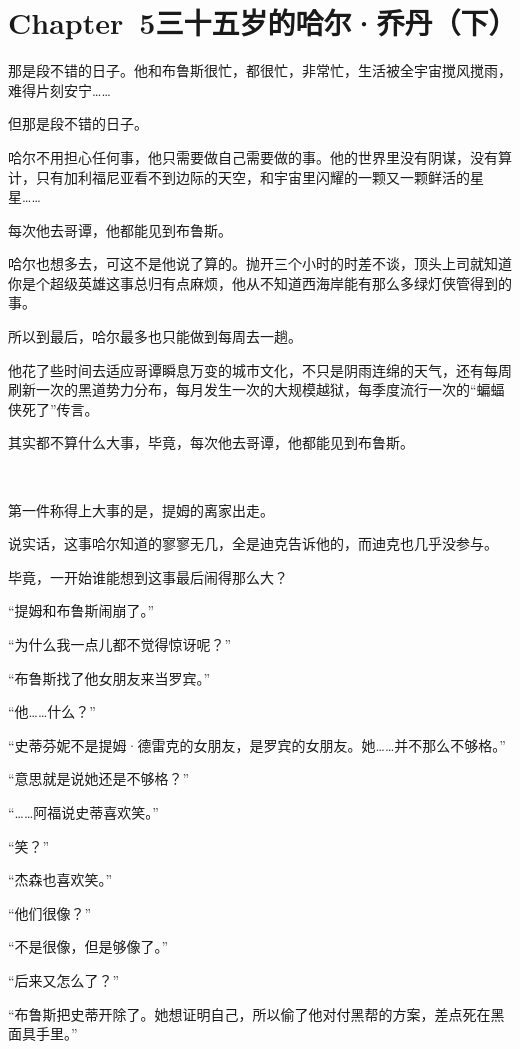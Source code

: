 \documentclass[../main]{subfiles}
\begin{document}

\section*{Chapter~5\hspace{1em}三十五岁的哈尔·乔丹（下）}

那是段不错的日子。他和布鲁斯很忙，都很忙，非常忙，生活被全宇宙搅风搅雨，难得片刻安宁……

但那是段不错的日子。

哈尔不用担心任何事，他只需要做自己需要做的事。他的世界里没有阴谋，没有算计，只有加利福尼亚看不到边际的天空，和宇宙里闪耀的一颗又一颗鲜活的星星……

每次他去哥谭，他都能见到布鲁斯。

哈尔也想多去，可这不是他说了算的。抛开三个小时的时差不谈，顶头上司就知道你是个超级英雄这事总归有点麻烦，他从不知道西海岸能有那么多绿灯侠管得到的事。

所以到最后，哈尔最多也只能做到每周去一趟。

他花了些时间去适应哥谭瞬息万变的城市文化，不只是阴雨连绵的天气，还有每周刷新一次的黑道势力分布，每月发生一次的大规模越狱，每季度流行一次的“蝙蝠侠死了”传言。

其实都不算什么大事，毕竟，每次他去哥谭，他都能见到布鲁斯。

~\

第一件称得上大事的是，提姆的离家出走。

说实话，这事哈尔知道的寥寥无几，全是迪克告诉他的，而迪克也几乎没参与。

毕竟，一开始谁能想到这事最后闹得那么大？

“提姆和布鲁斯闹崩了。”

“为什么我一点儿都不觉得惊讶呢？”

“布鲁斯找了他女朋友来当罗宾。”

“他……什么？”

“史蒂芬妮不是提姆·德雷克的女朋友，是罗宾的女朋友。她……并不那么不够格。”

“意思就是说她还是不够格？”

“……阿福说史蒂喜欢笑。”

“笑？”

“杰森也喜欢笑。”

“他们很像？”

“不是很像，但是够像了。”

“后来又怎么了？”

“布鲁斯把史蒂开除了。她想证明自己，所以偷了他对付黑帮的方案，差点死在黑面具手里。”
\end{document}
